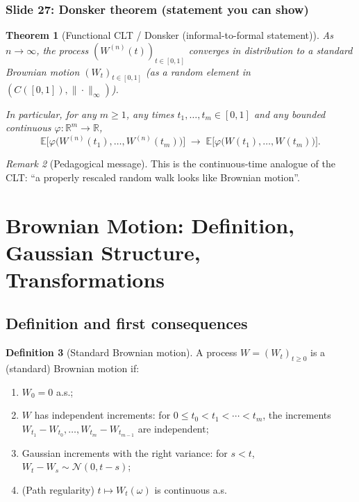 \documentclass[11pt]{article}
\newtheorem{theorem}{Theorem}[section]
\theoremstyle{definition}
\newtheorem{definition}[theorem]{Definition}
\theoremstyle{remark}
\newtheorem{remark}[theorem]{Remark}
\newcommand{\E}{\mathbb{E}}
\newcommand{\R}{\mathbb{R}}
\begin{document}
\subsubsection*{Slide 27: Donsker theorem (statement you can show)}

\begin{theorem}[Functional CLT / Donsker (informal-to-formal statement)]
As $n\to\infty$, the process $(W^{(n)}(t))_{t\in[0,1]}$ converges in distribution to a standard Brownian motion $(W_t)_{t\in[0,1]}$
(as a random element in $(C([0,1]),\|\cdot\|_\infty)$).

In particular, for any $m\ge1$, any times $t_1,\dots,t_m\in[0,1]$ and any bounded continuous $\varphi:\R^m\to\R$,
\[
\E\big[\varphi\big(W^{(n)}(t_1),\dots,W^{(n)}(t_m)\big)\big]
\;\longrightarrow\;
\E\big[\varphi\big(W(t_1),\dots,W(t_m)\big)\big].
\]
\end{theorem}

\begin{remark}[Pedagogical message]
This is the continuous-time analogue of the CLT: ``a properly rescaled random walk looks like Brownian motion''.
\end{remark}

\section{Brownian Motion: Definition, Gaussian Structure, Transformations}

\subsection{Definition and first consequences}

\begin{definition}[Standard Brownian motion]
A process $W=(W_t)_{t\ge0}$ is a (standard) Brownian motion if:
\begin{enumerate}[label=(BM\arabic*)]
\item $W_0=0$ a.s.;
\item $W$ has independent increments:
for $0\le t_0<t_1<\cdots<t_m$, the increments $W_{t_1}-W_{t_0},\dots,W_{t_m}-W_{t_{m-1}}$ are independent;
\item Gaussian increments with the right variance:
for $s<t$, $W_t-W_s\sim \mathcal{N}(0,t-s)$;
\item (Path regularity) $t\mapsto W_t(\omega)$ is continuous a.s.
\end{enumerate}
\end{definition}
\end{document}
